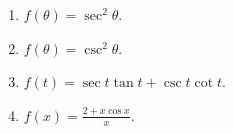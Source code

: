 \begin{multicols}{3}
\begin{enumerate}
\item $\displaystyle f(\theta)=\sec^2\theta$.

\item $\displaystyle f(\theta)=\csc^2\theta$.


\item $\displaystyle f(t)=\sec t \tan t +\csc t \cot t$.

\item $\displaystyle f(x)=\frac{2+x\cos x}{x}$.

\end{enumerate}
\end{multicols}